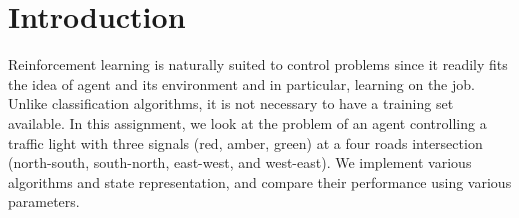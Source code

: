 \section {Introduction}

Reinforcement learning is naturally suited to control problems
since it readily fits the idea of agent and its environment and
in particular, learning on the job. Unlike classification algorithms,
it is not necessary to have a training set available. In this assignment,
we look at the problem of an agent controlling a traffic light with
three signals (red, amber, green) at a four roads intersection (north-south,
south-north, east-west, and west-east). We implement various algorithms
and state representation, and compare their performance using
various parameters.
